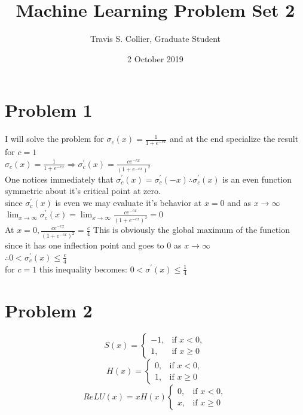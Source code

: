 \documentclass[a4paper,12pt]{article}
\begin{document}
\title{Machine Learning Problem Set 2}
\author{Travis S. Collier, Graduate Student}
\date{2 October 2019}
\maketitle

\section{Problem 1}
I will solve the problem for $\sigma_c(x) = \frac{1}{1+e^{-cx}}$ and at the end specialize the result for $c=1$ \\
$\sigma_c(x) = \frac{1}{1+e^{-cx}} \Rightarrow \sigma^{'}_c(x) = \frac{ce^{-cx}}{(1+e^{-cx})^2}$\\
One notices immediately that $\sigma^{'}_c(x) = \sigma^{'}_c(-x) \therefore \sigma^{'}_c(x)$ is an even function symmetric about it's critical point at zero.\\
since $\sigma^{'}_c(x)$ is even we may evaluate it's behavior at $x=0$ and as $x\rightarrow\infty$\\
$\lim_{x\rightarrow\infty}\sigma^{'}_c(x) = \lim_{x\rightarrow\infty}\frac{ce^{-cx}}{(1+e^{-cx})^2} = 0$\\
At $x=0, \frac{ce^{-cx}}{(1+e^{-cx})^2}=\frac{c}{4}$ This is obviously the global maximum of the function since it has one inflection point and goes to 0 as $x\rightarrow\infty$\\
$\therefore 0 < \sigma^{'}_c(x) \leq \frac{c}{4}$\\
for $c=1$ this inequality becomes: $0 < \sigma^{'}(x) \leq \frac{1}{4}$\\

\section{Problem 2}
\begin{equation}
S(x)=
\begin{cases}
-1, &\text{if  }  x < 0,\\
1, &\text{if  }  x \geq 0
\end{cases}
\end{equation}
\begin{equation}
H(x)=
\begin{cases}
0, &\text{if  }  x < 0,\\
1, &\text{if  }  x \geq 0
\end{cases}
\end{equation}
\begin{equation}
ReLU(x)=xH(x)
\begin{cases}
0, &\text{if  }  x < 0,\\
x, &\text{if  }  x \geq 0
\end{cases}
\end{equation}
\end{document}
